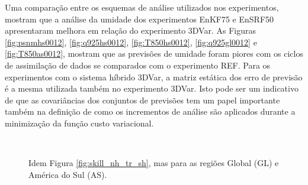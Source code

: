 Uma comparação entre os esquemas de análise utilizados nos experimentos, mostram que a análise da umidade dos experimentos EnKF75 e EnSRF50 apresentaram melhora em relação do experimento 3DVar. As Figuras \ref{fig:psnmhs0012}, \ref{fig:q925hs0012}, \ref{fig:T850hs0012}, \ref{fig:q925gl0012} e \ref{fig:T850as0012}, mostram que as previsões de umidade foram piores com os ciclos de assimilação de dados se comparados com o experimento REF. Para os experimentos com o sistema híbrido 3DVar, a matriz estática dos erro de previsão é a mesma utilizada também no experimento 3DVar. Isto pode ser um indicativo de que as covariâncias dos conjuntos de previsões tem um papel importante também na definição de como os incrementos de análise são aplicados durante a minimização da função custo variacional.

\begin{figure}[H]
    \vspace{2mm}
    \caption{Idem Figura \ref{fig:skill_nh_tr_sh}, mas para as regiões Global (GL) e América do Sul (AS).}
    \begin{center}
        \\     
\end{center}
\end{figure}

